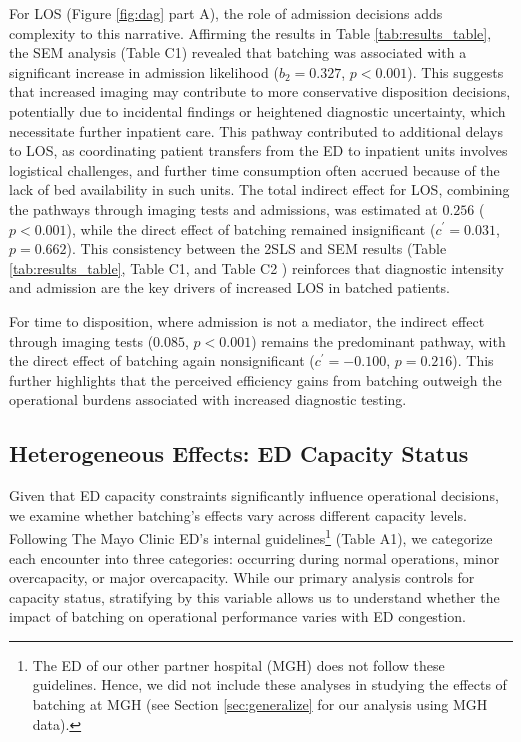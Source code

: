 \documentclass[,,nonblindrev]{informs}
\begin{document}
For LOS (Figure \ref{fig:dag} part A), the role of admission decisions
adds complexity to this narrative. Affirming the results in Table
\ref{tab:results_table}, the SEM analysis (Table C1) revealed that
batching was associated with a significant increase in admission
likelihood (\(b_2 = 0.327\), \(p < 0.001\)). This suggests that
increased imaging may contribute to more conservative disposition
decisions, potentially due to incidental findings or heightened
diagnostic uncertainty, which necessitate further inpatient care. This
pathway contributed to additional delays to LOS, as coordinating patient
transfers from the ED to inpatient units involves logistical challenges,
and further time consumption often accrued because of the lack of bed
availability in such units. The total indirect effect for LOS, combining
the pathways through imaging tests and admissions, was estimated at
\(0.256\) (\(p < 0.001\)), while the direct effect of batching remained
insignificant (\(c^\prime = 0.031\), \(p = 0.662\)). This consistency
between the 2SLS and SEM results (Table \ref{tab:results_table}, Table
C1, and Table C2 ) reinforces that diagnostic intensity and admission
are the key drivers of increased LOS in batched patients.

For time to disposition, where admission is not a mediator, the indirect
effect through imaging tests (\(0.085\), \(p < 0.001\)) remains the
predominant pathway, with the direct effect of batching again
nonsignificant (\(c^\prime = -0.100\), \(p = 0.216\)). This further
highlights that the perceived efficiency gains from batching outweigh
the operational burdens associated with increased diagnostic testing.

\subsection{Heterogeneous Effects: ED Capacity
Status}\label{heterogeneous-effects-ed-capacity-status}

Given that ED capacity constraints significantly influence operational
decisions, we examine whether batching's effects vary across different
capacity levels. Following The Mayo Clinic ED's internal
guidelines\footnote{The ED of our other partner hospital (MGH) does not follow these guidelines. Hence, we did not include these analyses in studying the effects of batching at MGH (see Section \ref{sec:generalize} for our analysis using MGH data).}
(Table A1), we categorize each encounter into three categories:
occurring during normal operations, minor overcapacity, or major
overcapacity. While our primary analysis controls for capacity status,
stratifying by this variable allows us to understand whether the impact
of batching on operational performance varies with ED congestion.
\end{document}
